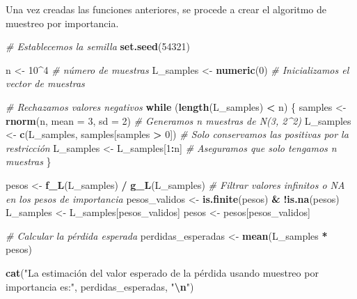 \documentclass[
]{article}
\newenvironment{Shaded}{\begin{snugshade}}{\end{snugshade}}
\newcommand{\AttributeTok}[1]{\textcolor[rgb]{0.13,0.29,0.53}{#1}}
\newcommand{\CommentTok}[1]{\textcolor[rgb]{0.56,0.35,0.01}{\textit{#1}}}
\newcommand{\ControlFlowTok}[1]{\textcolor[rgb]{0.13,0.29,0.53}{\textbf{#1}}}
\newcommand{\DecValTok}[1]{\textcolor[rgb]{0.00,0.00,0.81}{#1}}
\newcommand{\FunctionTok}[1]{\textcolor[rgb]{0.13,0.29,0.53}{\textbf{#1}}}
\newcommand{\NormalTok}[1]{#1}
\newcommand{\OtherTok}[1]{\textcolor[rgb]{0.56,0.35,0.01}{#1}}
\newcommand{\SpecialCharTok}[1]{\textcolor[rgb]{0.81,0.36,0.00}{\textbf{#1}}}
\newcommand{\StringTok}[1]{\textcolor[rgb]{0.31,0.60,0.02}{#1}}
\begin{document}
Una vez creadas las funciones anteriores, se procede a crear el
algoritmo de muestreo por importancia.

\begin{Shaded}
\begin{Highlighting}[]
\CommentTok{\# Establecemos la semilla}
\FunctionTok{set.seed}\NormalTok{(}\DecValTok{54321}\NormalTok{)}

\NormalTok{n }\OtherTok{\textless{}{-}} \DecValTok{10}\SpecialCharTok{\^{}}\DecValTok{4}  \CommentTok{\# número de muestras}
\NormalTok{L\_samples }\OtherTok{\textless{}{-}} \FunctionTok{numeric}\NormalTok{(}\DecValTok{0}\NormalTok{)  }\CommentTok{\# Inicializamos el vector de muestras}

\CommentTok{\# Rechazamos valores negativos}
\ControlFlowTok{while}\NormalTok{ (}\FunctionTok{length}\NormalTok{(L\_samples) }\SpecialCharTok{\textless{}}\NormalTok{ n) \{}
\NormalTok{  samples }\OtherTok{\textless{}{-}} \FunctionTok{rnorm}\NormalTok{(n, }\AttributeTok{mean =} \DecValTok{3}\NormalTok{, }\AttributeTok{sd =} \DecValTok{2}\NormalTok{)  }\CommentTok{\# Generamos n muestras de N(3, 2\^{}2)}
\NormalTok{  L\_samples }\OtherTok{\textless{}{-}} \FunctionTok{c}\NormalTok{(L\_samples, samples[samples }\SpecialCharTok{\textgreater{}} \DecValTok{0}\NormalTok{])  }\CommentTok{\# Solo conservamos las positivas por la restricción}
\NormalTok{  L\_samples }\OtherTok{\textless{}{-}}\NormalTok{ L\_samples[}\DecValTok{1}\SpecialCharTok{:}\NormalTok{n]  }\CommentTok{\# Aseguramos que solo tengamos n muestras}
\NormalTok{\}}

\NormalTok{pesos }\OtherTok{\textless{}{-}} \FunctionTok{f\_L}\NormalTok{(L\_samples) }\SpecialCharTok{/} \FunctionTok{g\_L}\NormalTok{(L\_samples)}
\CommentTok{\# Filtrar valores infinitos o NA en los pesos de importancia}
\NormalTok{pesos\_validos }\OtherTok{\textless{}{-}} \FunctionTok{is.finite}\NormalTok{(pesos) }\SpecialCharTok{\&} \SpecialCharTok{!}\FunctionTok{is.na}\NormalTok{(pesos)}
\NormalTok{L\_samples }\OtherTok{\textless{}{-}}\NormalTok{ L\_samples[pesos\_validos]}
\NormalTok{pesos }\OtherTok{\textless{}{-}}\NormalTok{ pesos[pesos\_validos]}

\CommentTok{\# Calcular la pérdida esperada}
\NormalTok{perdidas\_esperadas }\OtherTok{\textless{}{-}} \FunctionTok{mean}\NormalTok{(L\_samples }\SpecialCharTok{*}\NormalTok{ pesos)}

\FunctionTok{cat}\NormalTok{(}\StringTok{"La estimación del valor esperado de la pérdida usando muestreo por importancia es:"}\NormalTok{, }
\NormalTok{    perdidas\_esperadas, }\StringTok{"}\SpecialCharTok{\textbackslash{}n}\StringTok{"}\NormalTok{)}
\end{Highlighting}
\end{Shaded}
\end{document}
